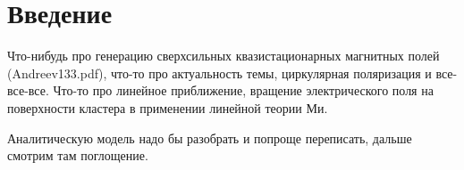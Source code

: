 \section{Введение}


Что-нибудь про генерацию сверхсильных квазистационарных магнитных полей (Andreev133.pdf), что-то про актуальность темы, циркулярная поляризация и все-все-все. Что-то про линейное приближение, вращение электрического поля на поверхности кластера в применении линейной теории Ми. 

Аналитическую модель надо бы разобрать и попроще переписать, дальше смотрим там поглощение.
